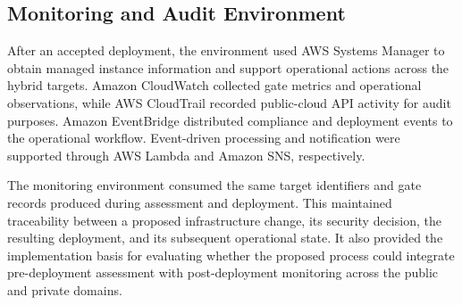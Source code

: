 \subsection{Monitoring and Audit Environment}
\label{subsec:monitoring-audit-environment}

After an accepted deployment, the environment used AWS Systems Manager to obtain managed
instance information and support operational actions across the hybrid targets. Amazon
CloudWatch collected gate metrics and operational observations, while AWS CloudTrail
recorded public-cloud API activity for audit purposes. Amazon EventBridge distributed
compliance and deployment events to the operational workflow. Event-driven processing
and notification were supported through AWS Lambda and Amazon SNS, respectively.

The monitoring environment consumed the same target identifiers and gate records
produced during assessment and deployment. This maintained traceability between a
proposed infrastructure change, its security decision, the resulting deployment, and
its subsequent operational state. It also provided the implementation basis for
evaluating whether the proposed process could integrate pre-deployment assessment with
post-deployment monitoring across the public and private domains.
